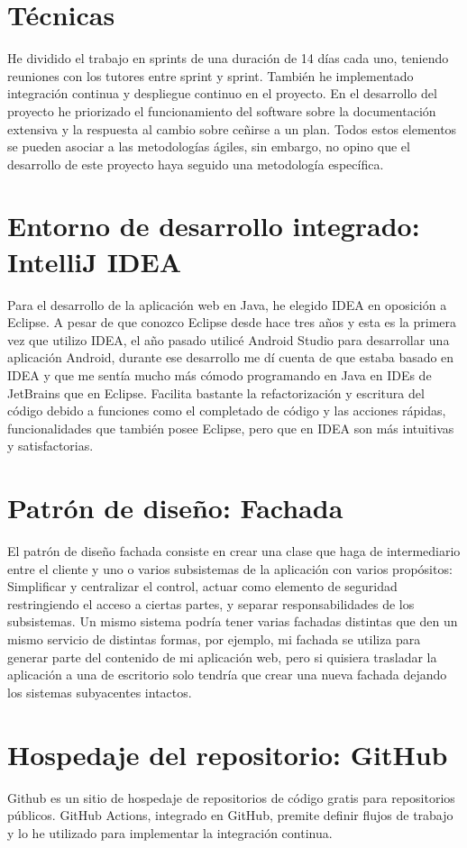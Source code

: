 \section{Técnicas}
He dividido el trabajo en sprints de una duración de 14 días cada uno, teniendo reuniones con los tutores entre sprint y sprint. También he implementado integración continua y despliegue continuo en el proyecto.
En el desarrollo del proyecto he priorizado el funcionamiento del software sobre la documentación extensiva y la respuesta al cambio sobre ceñirse a un plan. Todos estos elementos se pueden asociar a las metodologías ágiles, sin embargo, no opino que el desarrollo de este proyecto haya seguido una metodología específica.
\section{Entorno de desarrollo integrado: IntelliJ IDEA}
Para el desarrollo de la aplicación web en Java, he elegido IDEA en oposición a Eclipse.
A pesar de que conozco Eclipse desde hace tres años y esta es la primera vez que utilizo IDEA, el año pasado utilicé Android Studio para desarrollar una aplicación Android, durante ese desarrollo me dí cuenta de que estaba basado en IDEA y que me sentía mucho más cómodo programando en Java en IDEs de JetBrains que en Eclipse. Facilita bastante la refactorización y escritura del código debido a funciones como el completado de código y las acciones rápidas, funcionalidades que también posee Eclipse, pero que en IDEA son más intuitivas y satisfactorias.
\section{Patrón de diseño: Fachada}
El patrón de diseño fachada consiste en crear una clase que haga de intermediario entre el cliente y uno o varios subsistemas de la aplicación con varios propósitos: Simplificar y centralizar el control, actuar como elemento de seguridad restringiendo el acceso a ciertas partes, y separar responsabilidades de los subsistemas. Un mismo sistema podría tener varias fachadas distintas que den un mismo servicio de distintas formas, por ejemplo, mi fachada se utiliza para generar parte del contenido de mi aplicación web, pero si quisiera trasladar la aplicación a una de escritorio solo tendría que crear una nueva fachada dejando los sistemas subyacentes intactos.
\section{Hospedaje del repositorio: GitHub}
Github es un sitio de hospedaje de repositorios de código gratis para repositorios públicos.
GitHub Actions, integrado en GitHub, premite definir flujos de trabajo y lo he utilizado para implementar la integración continua.
